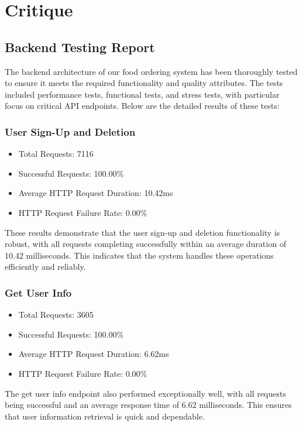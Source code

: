 \documentclass{article}
\begin{document}
\section{Critique}
\subsection{Backend Testing Report}

The backend architecture of our food ordering system has been thoroughly tested to ensure it meets the required functionality and quality attributes. The tests included performance tests, functional tests, and stress tests, with particular focus on critical API endpoints. Below are the detailed results of these tests:

\subsubsection*{User Sign-Up and Deletion}

\begin{itemize}
  \item Total Requests: 7116
  \item Successful Requests: 100.00\%
  \item Average HTTP Request Duration: 10.42ms
  \item HTTP Request Failure Rate: 0.00\%
\end{itemize}

These results demonstrate that the user sign-up and deletion functionality is robust, with all requests completing successfully within an average duration of 10.42 milliseconds. This indicates that the system handles these operations efficiently and reliably.

\subsubsection*{Get User Info}

\begin{itemize}
  \item Total Requests: 3605
  \item Successful Requests: 100.00\%
  \item Average HTTP Request Duration: 6.62ms
  \item HTTP Request Failure Rate: 0.00\%
\end{itemize}

The get user info endpoint also performed exceptionally well, with all requests being successful and an average response time of 6.62 milliseconds. This ensures that user information retrieval is quick and dependable.
\end{document}
